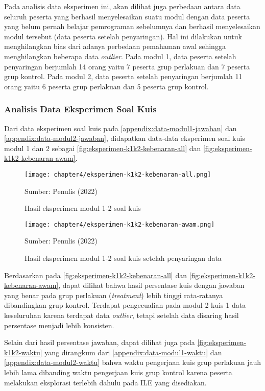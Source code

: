 Pada analisis data eksperimen ini, akan dilihat juga perbedaan antara data seluruh peserta yang berhasil menyelesaikan suatu modul dengan data peserta yang belum pernah belajar pemrograman sebelumnya dan berhasil menyelesaikan modul tersebut (data peserta setelah penyaringan). Hal ini dilakukan untuk menghilangkan bias dari adanya perbedaan pemahaman awal sehingga menghilangkan beberapa data \textit{outlier}. Pada modul 1, data peserta setelah penyaringan berjumlah 14 orang yaitu 7 peserta grup perlakuan dan 7 peserta grup kontrol. Pada modul 2, data peserta setelah penyaringan berjumlah 11 orang yaitu 6 peserta grup perlakuan dan 5 peserta grup kontrol.


\subsubsection{Analisis Data Eksperimen Soal Kuis}

Dari data eksperimen soal kuis pada \autoref{appendix:data-modul1-jawaban} dan \autoref{appendix:data-modul2-jawaban}, didapatkan data-data eksperimen soal kuis modul 1 dan 2 sebagai \autoref{fig:eksperimen-k1k2-kebenaran-all} dan \autoref{fig:eksperimen-k1k2-kebenaran-awam}.

\begin{figure}[!h]
  \centering
  \texttt{[image: chapter4/eksperimen-k1k2-kebenaran-all.png]}
  \caption{Hasil eksperimen modul 1-2 soal kuis} \label{fig:eksperimen-k1k2-kebenaran-all}
  Sumber: Penulis (2022)
\end{figure}
\begin{figure}[!h]
  \centering
  \texttt{[image: chapter4/eksperimen-k1k2-kebenaran-awam.png]}
  \caption{Hasil eksperimen modul 1-2 soal kuis setelah penyaringan data} \label{fig:eksperimen-k1k2-kebenaran-awam}
  Sumber: Penulis (2022)
\end{figure}

Berdasarkan pada \autoref{fig:eksperimen-k1k2-kebenaran-all} dan \autoref{fig:eksperimen-k1k2-kebenaran-awam}, dapat dilihat bahwa hasil persentase kuis dengan jawaban yang benar pada grup perlakuan (\textit{treatment}) lebih tinggi rata-ratanya dibandingkan grup kontrol. Terdapat pengecualian pada modul 2 kuis 1 data keseluruhan karena terdapat data \textit{outlier}, tetapi setelah data disaring hasil persentase menjadi lebih konsisten.

Selain dari hasil persentase jawaban, dapat dilihat juga pada \autoref{fig:eksperimen-k1k2-waktu} yang dirangkum dari \autoref{appendix:data-modul1-waktu} dan \autoref{appendix:data-modul2-waktu} bahwa waktu pengerjaan kuis grup perlakuan jauh lebih lama dibanding waktu pengerjaan kuis grup kontrol karena peserta melakukan eksplorasi terlebih dahulu pada ILE yang disediakan.

